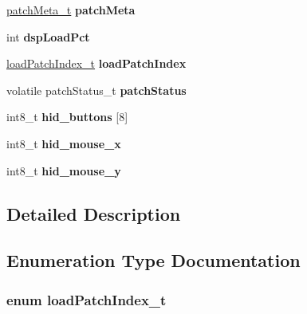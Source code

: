 \begin{DoxyCompactItemize}
\item 
\hyperlink{structpatchMeta__t}{patch\+Meta\+\_\+t} {\bfseries patch\+Meta}\hypertarget{group__PATCH_gabbe69b456de52cc50d13aa8b2a40fe33}{}\label{group__PATCH_gabbe69b456de52cc50d13aa8b2a40fe33}

\item 
int {\bfseries dsp\+Load\+Pct}\hypertarget{group__PATCH_ga303095d9b42ea98a7774408cb6b9002a}{}\label{group__PATCH_ga303095d9b42ea98a7774408cb6b9002a}

\item 
\hyperlink{group__PATCH_ga3bcfa0e2fd6136eb75131fe31d3c0ecf}{load\+Patch\+Index\+\_\+t} {\bfseries load\+Patch\+Index}\hypertarget{group__PATCH_gaa80fbf326cad24186fef5deb1e9955b9}{}\label{group__PATCH_gaa80fbf326cad24186fef5deb1e9955b9}

\item 
volatile patch\+Status\+\_\+t {\bfseries patch\+Status}\hypertarget{group__PATCH_gaed5f4bc76f15ab59017a023d4aceb7f8}{}\label{group__PATCH_gaed5f4bc76f15ab59017a023d4aceb7f8}

\item 
int8\+\_\+t {\bfseries hid\+\_\+buttons} \mbox{[}8\mbox{]}\hypertarget{group__PATCH_ga82f9abd6b96ad35c37503df9591c78f1}{}\label{group__PATCH_ga82f9abd6b96ad35c37503df9591c78f1}

\item 
int8\+\_\+t {\bfseries hid\+\_\+mouse\+\_\+x}\hypertarget{group__PATCH_gacc1b5260da1297dc66e7b09c3dad105f}{}\label{group__PATCH_gacc1b5260da1297dc66e7b09c3dad105f}

\item 
int8\+\_\+t {\bfseries hid\+\_\+mouse\+\_\+y}\hypertarget{group__PATCH_gad793bc8085609751ca032b344d390c50}{}\label{group__PATCH_gad793bc8085609751ca032b344d390c50}

\end{DoxyCompactItemize}


\subsection{Detailed Description}


\subsection{Enumeration Type Documentation}
\subsubsection[{\texorpdfstring{load\+Patch\+Index\+\_\+t}{loadPatchIndex_t}}]{\setlength{\rightskip}{0pt plus 5cm}enum {\bf load\+Patch\+Index\+\_\+t}}\hypertarget{group__PATCH_ga3bcfa0e2fd6136eb75131fe31d3c0ecf}{}\label{group__PATCH_ga3bcfa0e2fd6136eb75131fe31d3c0ecf}


